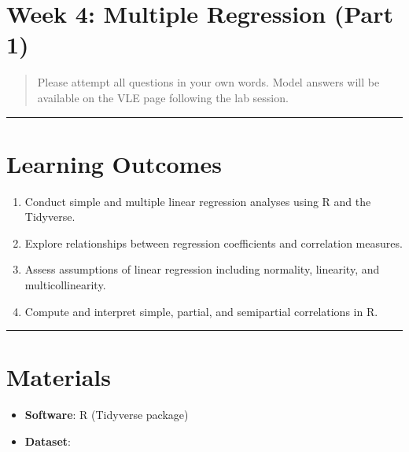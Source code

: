\documentclass[
  letterpaper,
  DIV=11,
  numbers=noendperiod]{scrreprt}
\providecommand{\tightlist}{%
  \setlength{\itemsep}{0pt}\setlength{\parskip}{0pt}}\usepackage{longtable,booktabs,array}
\begin{document}
\section{Week 4: Multiple Regression (Part
1)}\label{week-4-multiple-regression-part-1}

\begin{quote}
Please attempt all questions in your own words. Model answers will be
available on the VLE page following the lab session.
\end{quote}

\begin{center}\rule{0.5\linewidth}{0.5pt}\end{center}

\label{sec-lab01-LO}
\section{Learning Outcomes}\label{learning-outcomes}

\begin{enumerate}
\def\labelenumi{\arabic{enumi}.}
\tightlist
\item
  Conduct simple and multiple linear regression analyses using R and the
  Tidyverse.\\
\item
  Explore relationships between regression coefficients and correlation
  measures.\\
\item
  Assess assumptions of linear regression including normality,
  linearity, and multicollinearity.\\
\item
  Compute and interpret simple, partial, and semipartial correlations in
  R.
\end{enumerate}

\begin{center}\rule{0.5\linewidth}{0.5pt}\end{center}

\section{Materials}\label{materials}

\begin{itemize}
\tightlist
\item
  \textbf{Software}: R (Tidyverse package)
\item
  \textbf{Dataset}:
\end{itemize}
\end{document}
